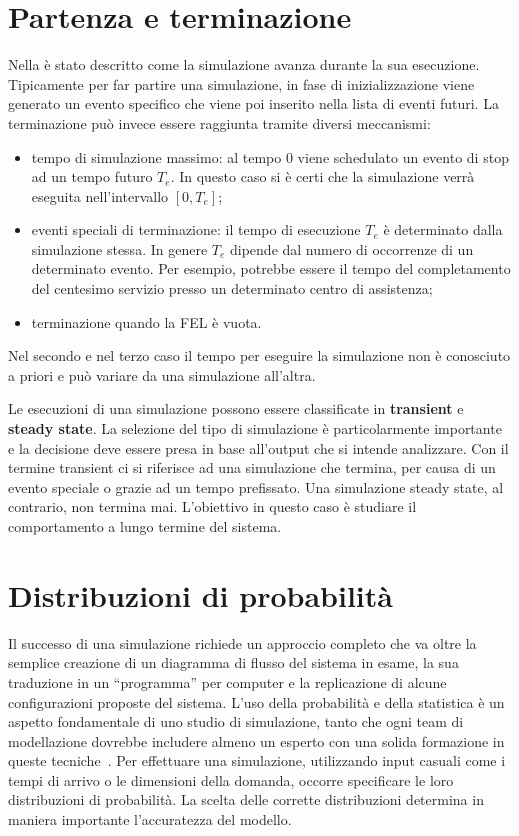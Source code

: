 \documentclass[12pt,a4paper,openright,twoside]{book}
\begin{document}
\section{Partenza e terminazione}
Nella  è stato descritto come la simulazione avanza durante la sua esecuzione. Tipicamente per far partire una simulazione, in fase di inizializzazione viene generato un evento specifico che viene poi inserito nella lista di eventi futuri. 
La terminazione può invece essere raggiunta tramite diversi meccanismi: 
\begin{itemize}
    \item tempo di simulazione massimo: al tempo 0 viene schedulato un evento di stop ad un tempo futuro $T_e$. In questo caso si è certi che la simulazione verrà eseguita nell'intervallo $[0, T_e]$; 
    \item eventi speciali di terminazione: il tempo di esecuzione $T_e$ è determinato dalla simulazione stessa. In genere $T_e$ dipende dal numero di occorrenze di un determinato evento. Per esempio, potrebbe essere il tempo del completamento del centesimo servizio presso un determinato centro di assistenza;  
    \item terminazione quando la FEL è vuota.
\end{itemize}
Nel secondo e nel terzo caso il tempo per eseguire la simulazione non è conosciuto a priori e può variare da una simulazione all'altra.

Le esecuzioni di una simulazione possono essere classificate in \textbf{transient} e \textbf{steady state}. La selezione del tipo di simulazione è particolarmente importante e la decisione deve essere presa in base all'output che si intende analizzare. Con il termine transient ci si riferisce ad una simulazione che termina, per causa di un evento speciale o grazie ad un tempo prefissato. 
Una simulazione steady state, al contrario, non termina mai. L'obiettivo in questo caso è studiare il comportamento a lungo termine del sistema. 

\section{Distribuzioni di probabilità}
Il successo di una simulazione richiede un approccio completo che va oltre la semplice creazione di un diagramma di flusso del sistema in esame, la sua traduzione in un ``programma'' per computer e la replicazione di alcune configurazioni proposte del sistema. L'uso della probabilità e della statistica è un aspetto fondamentale di uno studio di simulazione, tanto che ogni team di modellazione dovrebbe includere almeno un esperto con una solida formazione in queste tecniche~\cite{Law15}.
Per effettuare una simulazione, utilizzando input casuali come i tempi di arrivo o le dimensioni della domanda, occorre specificare le loro distribuzioni di probabilità. La scelta delle corrette distribuzioni determina in maniera importante l'accuratezza del modello. 
\end{document}

